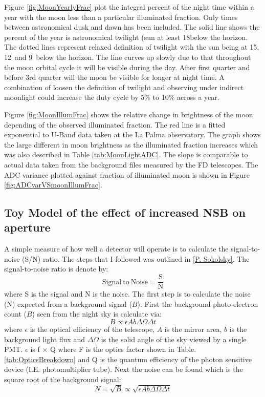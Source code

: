 Figure \ref{fig:MoonYearlyFrac} plot the integral percent of the night time within a year with the moon less than a particular illuminated fraction. Only times between astronomical dusk and dawn has been included. The solid line shows the percent of the year is astronomical twilight (sun at least 18\textdegree below the horizon. The dotted lines represent relaxed definition of twilight with the sun being at 15\textdegree , 12\textdegree \ and 9\textdegree \ below the horizon. The line curves up slowly due to that throughout the moon orbital cycle it will be visible during the day. After first quarter and before 3rd quarter will the moon be visible for longer at night time. A combination of loosen the definition of twilight and observing under indirect moonlight could increase the duty cycle by 5\% to 10\% across a year.


Figure \ref{fig:MoonIllumFrac} shows the relative change in brightness of the moon depending of the observed illuminated fraction. The red line is a fitted exponential to U-Band data taken at the La Palma observatory. The graph shows the large different in moon brightness as the illuminated fraction increases which was also described in Table \ref{tab:MoonLightADC}. The slope is comparable to actual data taken from the background files measured by the FD telescopes. The ADC variance plotted against fraction of illuminated moon is shown in Figure \ref{fig:ADCvarVSmoonIllumFrac}.


\subsection{Toy Model of the effect of increased NSB on aperture}

A simple measure of how well a detector will operate is to calculate the signal-to-noise (S/N) ratio. The steps that I followed was outlined in \ref{P. Sokolsky}. The signal-to-noise ratio is denote by:
\begin{equation}
\mathrm{Signal \ to \ Noise} = \frac{\mathrm{S}}{\mathrm{N}} \label{eq:SNratio}
\end{equation}
where S is the signal and N is the noise. The first step is to calculate the noise (N) expected from a background signal ($B$). First the background photo-electron count ($B$) seen from the night sky is calculate via:
\begin{equation}
B \propto \epsilon A b \Delta \Omega \Delta t \nonumber
\end{equation}
where $\epsilon$ is the optical efficiency of the telescope, $A$ is the mirror area, $b$ is the background light flux and $\Delta\Omega$ is the solid angle of the sky viewed by a single PMT. $\epsilon$ is f $\times$ Q where F is the optics factor shown in Table. \ref{tab:OpticsBreakdown} and Q is the quantum efficiency of the photon sensitive device (I.E. photomultiplier tube). Next the noise can be found which is the square root of the background signal:
\begin{equation}
N = \sqrt{B} \propto \sqrt{\epsilon A b \Delta \Omega \Delta t} \label{eq:DetectNoise}
\end{equation}

